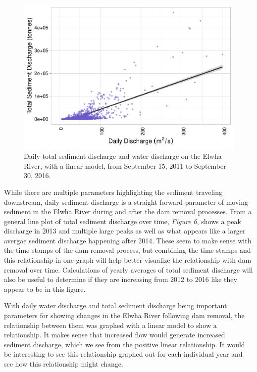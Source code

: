 \documentclass[12pt,]{article}
\begin{document}
\begin{figure}
\centering
\includegraphics{Mason_ENV872_ProjectFinal_files/figure-latex/Exploratory Analysis Figure 7-1.pdf}
\caption{Daily total sediment discharge and water discharge on the Elwha
River, with a linear model, from September 15, 2011 to September 30,
2016.}
\end{figure}

While there are multiple parameters highlighting the sediment traveling
downstream, daily sediment discharge is a straight forward parameter of
moving sediment in the Elwha River during and after the dam removal
processes. From a general line plot of total sediment discharge over
time, \emph{Figure 6}, shows a peak discharge in 2013 and multiple large
peaks as well as what appears like a larger avergae sediment discharge
happening after 2014. These seem to make sense with the time stamps of
the dam removal process, but combining the time stamps and this
relationship in one graph will help better visualize the relationship
with dam removal over time. Calculations of yearly averages of total
sediment discharge will also be useful to determine if they are
increasing from 2012 to 2016 like they appear to be in this figure.

With daily water discharge and total sediment discharge being important
parameters for showing changes in the Elwha River following dam removal,
the relationship between them was graphed with a linear model to show a
relationship. It makes sense that increased flow would generate
increased sediment discharge, which we see from the positive linear
relationship. It would be interesting to see this relationship graphed
out for each individual year and see how this relationship might change.
\end{document}
